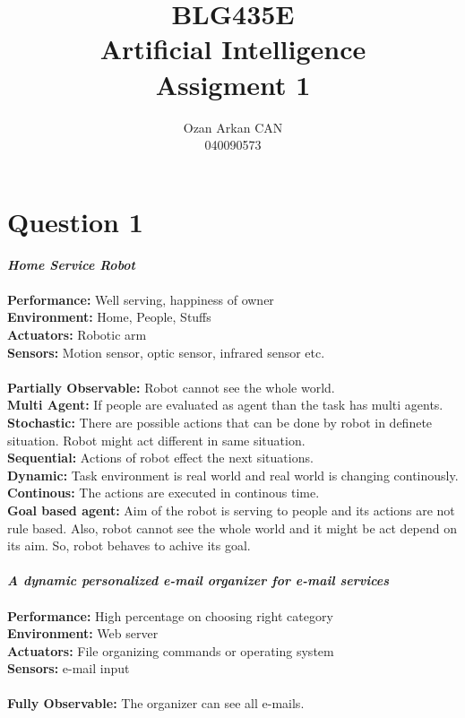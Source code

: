 \documentclass[a4paper,11pt]{report}
\title{\LARGE{ \textbf{BLG435E}} \\ \vspace{15mm}
Artificial Intelligence\\ \vspace{10mm}  
Assigment 1\\ \vspace{15mm}}
\author{Ozan Arkan CAN\\ 
040090573\\}
\begin{document}
\maketitle

\section*{Question 1}
\emph{\textbf{Home Service Robot}}\\
\\
\textbf{Performance:} Well serving, happiness of owner\\
\textbf{Environment:} Home, People, Stuffs\\
\textbf{Actuators:} Robotic arm\\
\textbf{Sensors:} Motion sensor, optic sensor, infrared sensor etc.\\
\\
\textbf{Partially Observable:} Robot cannot see the whole world.\\
\textbf{Multi Agent:} If people are evaluated as agent than the task has multi agents.\\
\textbf{Stochastic:} There are possible actions that can be done by robot in definete situation. Robot might act different in same situation.\\
\textbf{Sequential:} Actions of robot effect the next situations.\\
\textbf{Dynamic:} Task environment is real world and real world is changing continously.\\
\textbf{Continous:} The actions are executed in continous time.\\
\textbf{Goal based agent:} Aim of the robot is serving to people and its actions are not rule based. Also, robot cannot see the whole world and it might be act depend on its aim. So, robot behaves to achive its goal.\\
\\
\emph{\textbf{A dynamic personalized e-mail organizer for e-mail services}}\\
\\
\textbf{Performance:} High percentage on choosing right category\\
\textbf{Environment:} Web server\\
\textbf{Actuators:} File organizing commands or operating system\\
\textbf{Sensors:} e-mail input\\
\\
\textbf{Fully Observable:} The organizer can see all e-mails.\\
\end{document}
